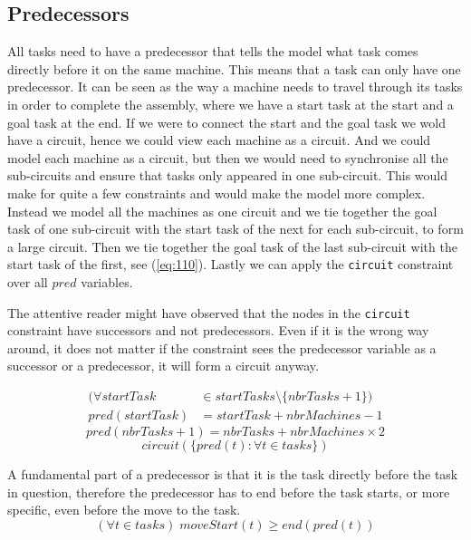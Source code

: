 
 \subsection{Predecessors}
 All tasks need to have a predecessor that tells the model what task comes directly before it on the same machine. This means that a task can only have one predecessor. It can be seen as the way a machine needs to travel through its tasks in order to complete the assembly, where we have a start task at the start and a goal task at the end. If we were to connect the start and the goal task we wold have a circuit, hence we could view each machine as a circuit. And we could model each machine as a circuit, but then we would need to synchronise all the sub-circuits and ensure that tasks only appeared in one sub-circuit. This would make for quite a few constraints and would make the model more complex. Instead we model all the machines as one circuit and we tie together the goal task of one sub-circuit with the start task of the next for each sub-circuit, to form a large circuit. Then we tie together the goal task of the last sub-circuit with the start task of the first, see (\ref{eq:110}). Lastly we can apply the \texttt{circuit} constraint over all $pred$ variables.
  
 The attentive reader might have observed that the nodes in the \texttt{circuit} constraint have successors and not predecessors. Even if it is the wrong way around, it does not matter if the constraint sees the predecessor variable as a successor or a predecessor, it will form a circuit anyway.
 
 \begin{equation}\label{eq:109}
 \begin{aligned}
 (\forall startTask &\in startTasks \setminus \{nbrTasks + 1\}) \\
 pred(startTask) &= startTask + nbrMachines - 1
 \end{aligned}
 \end{equation}
 \begin{equation}\label{eq:110}
 pred(nbrTasks + 1) = nbrTasks + nbrMachines \times 2
 \end{equation}
 \begin{equation}\label{eq:111}
 circuit(\{pred(t) : \forall t \in tasks\})
 \end{equation}

  \noindent A fundamental part of a predecessor is that it is the task directly before the task in question, therefore the predecessor has to end before the task starts, or more specific, even before the move to the task.
 \begin{equation}\label{eq:108}
 (\forall t \in tasks) \; moveStart(t) \geq end(pred(t))
 \end{equation}

